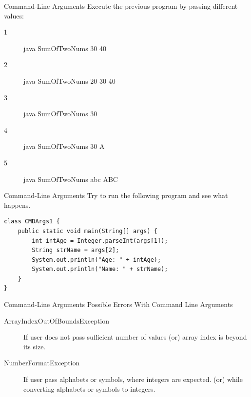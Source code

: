 \documentclass[12pt]{beamer}
\begin{document}
\begin{frame}[fragile]{Command-Line Arguments}
 Execute the previous program by passing different values:
 
 \vspace{1pc}
 \begin{description}
  \item [1] java SumOfTwoNums 30 40
  \item [2] java SumOfTwoNums 20 30 40
  \item [3] java SumOfTwoNums 30
  \item [4] java SumOfTwoNums 30 A
  \item [5] java SumOfTwoNums abc ABC
 \end{description}
\end{frame}

\begin{frame}[fragile]{Command-Line Arguments}
Try to run the following program and see what happens.
\begin{lstlisting}[numbers=none]
class CMDArgs1 {
    public static void main(String[] args) {
        int intAge = Integer.parseInt(args[1]);
        String strName = args[2];
        System.out.println("Age: " + intAge);
        System.out.println("Name: " + strName);
    }
}
\end{lstlisting}
\end{frame}

\begin{frame}{Command-Line Arguments}
 Possible Errors With Command Line Arguments
 
 \vspace{1pc}
 \begin{description}
  \item [ArrayIndexOutOfBoundsException] If user does not pass sufficient number of values (or) array index is beyond its size.
  \item [NumberFormatException] If user pass alphabets or symbols, where integers are expected.  (or)  while  converting alphabets or symbols to integers.
 \end{description}
\end{frame}
\end{document}
